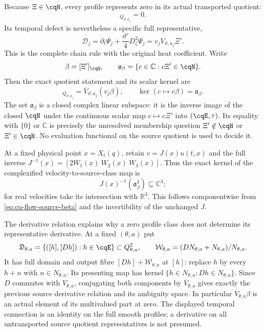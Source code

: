 Because $\Xi\in\cqN$, every profile represents zero in its actual
transported quotient:
\begin{equation}
 [\Psi_j]_{Q_{\vartheta,a_j}}=0.
 \label{eq:cq-flow-profile-zero}
\end{equation}
Its temporal defect is nevertheless a specific full representative,
\[
 \mathcal D_j=\partial_t\Psi_j+
              \frac{\vartheta'}4D_\zeta^2\Psi_j
             =v_jV_{\vartheta,a_j}\Xi'.
\]
This is the complete chain rule with the original heat coefficient.
Write
\[
 \beta=[\Xi']_{\cqQ},\qquad
 \mathfrak a_\beta=\{c\in\mathbb C:c\Xi'\in\cqN\}.
\]
Then the exact quotient statement and its scalar kernel are
\begin{equation}
 [\mathcal D_j]_{Q_{\vartheta,a_j}}
    =\overline V_{\vartheta,a_j}(v_j\beta),\qquad
 \ker(c\mapsto c\beta)=\mathfrak a_\beta .
 \label{eq:cq-flow-source-beta}
\end{equation}
The set $\mathfrak a_\beta$ is a closed complex linear subspace:
it is the inverse image of the closed $\cqN$ under the continuous
scalar map $c\mapsto c\Xi'$ into $(\cqE,\tau)$.
Its equality with $\{0\}$ or $\mathbb C$ is precisely the unresolved
membership question $\Xi'\notin\cqN$ or $\Xi'\in\cqN$.
No evaluation functional on the source quotient is used to decide it.

At a fixed physical point $x=X_t(q)$, retain
$v=J(x)u(t,x)$ and the full inverse
$J^{-1}(x)=[2W_1(x)\ W_2(x)\ W_3(x)]$. Thus the exact kernel of
the complexified velocity-to-source-class map is
\[
 J(x)^{-1}(\mathfrak a_\beta^3)\subseteq\mathbb C^3;
\]
for real velocities take its intersection with $\mathbb R^3$.
This follows componentwise from \eqref{eq:cq-flow-source-beta} and
the invertibility of the unchanged $J$.

The derivative relation explains why a zero profile class does not
determine its representative derivative. At a fixed $(\theta,a)$ put
\[
 \mathfrak D_{\theta,a}
 =\{([h],[Dh]):h\in\cqE\}\subset Q_{\theta,a}^2,\qquad
 \mathcal W_{\theta,a}
 =(DN_{\theta,a}+N_{\theta,a})/N_{\theta,a}.
\]
It has full domain and output fibre $[Dh]+\mathcal W_{\theta,a}$
at $[h]$: replace $h$ by every $h+n$ with $n\in N_{\theta,a}$.
Its presenting map has kernel
$\{h\in N_{\theta,a}:Dh\in N_{\theta,a}\}$.
Since $D$ commutes with $V_{\theta,a}$, conjugating both components
by $\overline V_{\theta,a}$ gives exactly the previous source
derivative relation and its ambiguity space. In particular
$\overline V_{\theta,a}\beta$ is an actual element of its
multivalued part at zero. The displayed temporal connection is an
identity on the full smooth profiles; a derivative on all
untransported source quotient representatives is not presumed.

